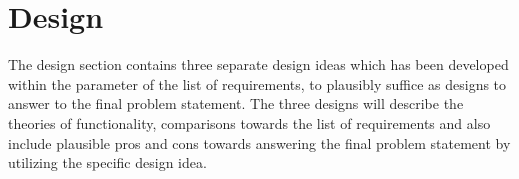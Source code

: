 \section{Design}
The design section contains three separate design ideas which has been developed within the parameter of the list of requirements, to plausibly suffice as designs to answer to the final problem statement. The three designs will describe the theories of functionality, comparisons towards the list of requirements and also include plausible pros and cons towards answering the final problem statement by utilizing the specific design idea.





